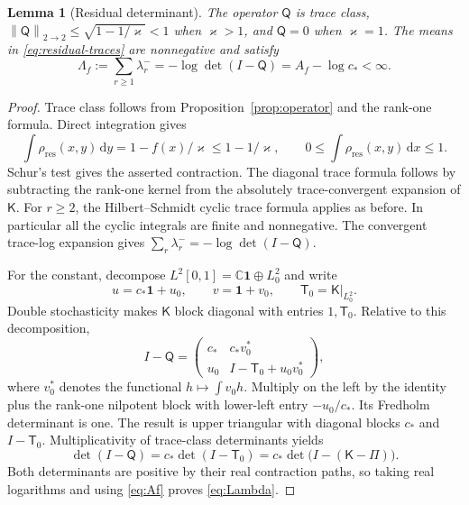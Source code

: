 \documentclass[11pt]{article}
\numberwithin{equation}{section}
\newtheorem{lemma}[theorem]{Lemma}
\theoremstyle{definition}
\theoremstyle{remark}
\newcommand{\one}{\mathbf 1}
\newcommand{\dd}{\,\mathrm d}
\newcommand{\Kop}{\mathsf K}
\newcommand{\Qop}{\mathsf Q}
\newcommand{\Top}{\mathsf T}
\newcommand{\norm}[1]{\left\|#1\right\|}
\begin{document}
\begin{lemma}[Residual determinant]\label{lem:residual-det}
The operator $\Qop$ is trace class, $\norm{\Qop}_{2\to2}\le\sqrt{1-1/\varkappa}<1$ when $\varkappa>1$, and $\Qop=0$ when $\varkappa=1$. The means in \eqref{eq:residual-traces} are nonnegative and satisfy
\begin{equation}\label{eq:Lambda}
 \Lambda_f:=\sum_{r\ge1}\lambda_r^-
 =-\log\det(I-\Qop)=A_f-\log c_*<\infty.
\end{equation}
\end{lemma}
\begin{proof}
Trace class follows from Proposition~\ref{prop:operator} and the rank-one formula. Direct integration gives
\[
 \int \rho_{\mathrm{res}}(x,y)\dd y=1-f(x)/\varkappa\le1-1/\varkappa,
 \qquad
 0\le\int \rho_{\mathrm{res}}(x,y)\dd x\le1.
\]
Schur's test gives the asserted contraction. The diagonal trace formula follows by subtracting the rank-one kernel from the absolutely trace-convergent expansion of $\Kop$. For $r\ge2$, the Hilbert--Schmidt cyclic trace formula applies as before. In particular all the cyclic integrals are finite and nonnegative. The convergent trace-log expansion gives $\sum_r\lambda_r^-=-\log\det(I-\Qop)$.

For the constant, decompose $L^2[0,1]=\mathbb C\one\oplus L^2_0$ and write
\[
 u=c_*\one+u_0,\qquad v=\one+v_0,
 \qquad \Top_0=\Kop|_{L^2_0}.
\]
Double stochasticity makes $\Kop$ block diagonal with entries $1,\Top_0$. Relative to this decomposition,
\begin{equation}\label{eq:block-det}
 I-\Qop=
 \begin{pmatrix}
 c_*&c_*v_0^*\\
 u_0&I-\Top_0+u_0v_0^*
 \end{pmatrix},
\end{equation}
where $v_0^*$ denotes the functional $h\mapsto\int v_0h$. Multiply on the left by the identity plus the rank-one nilpotent block with lower-left entry $-u_0/c_*$. Its Fredholm determinant is one. The result is upper triangular with diagonal blocks $c_*$ and $I-\Top_0$. Multiplicativity of trace-class determinants yields
\begin{equation}\label{eq:det-factorization}
 \det(I-\Qop)=c_*\det(I-\Top_0)
             =c_*\det\bigl(I-(\Kop-\Pi)\bigr).
\end{equation}
Both determinants are positive by their real contraction paths, so taking real logarithms and using \eqref{eq:Af} proves \eqref{eq:Lambda}.
\end{proof}
\end{document}
